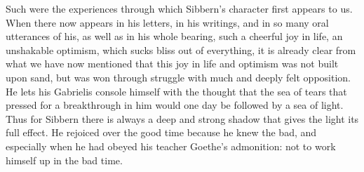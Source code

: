 \documentclass[12pt,a4paper,openany]{book}
\newcommand{\opage}[1]{\marginnote{\footnotesize\textit{[#1]}}}
\begin{document}
Such were the experiences through which Sibbern's
character first appears to us. When there now appears in his
letters, in his writings, and in so many oral utterances
of his, as well as in his whole bearing, such
a cheerful joy in life, an unshakable optimism, which sucks
bliss out of everything, it is already clear from what we have now
mentioned that this joy in life and optimism was not
built upon sand, but was won through struggle with much
and deeply felt opposition. He lets his Gabrielis console himself
with the thought that the sea of tears that pressed for a
\opage{68}breakthrough in him would one day be followed by a sea of light. Thus
for Sibbern there is always a deep and strong shadow that gives
the light its full effect. He rejoiced over the good time
because he knew the bad, and especially when he had
obeyed his teacher Goethe's admonition: not to work himself up
in the bad time.
\end{document}
